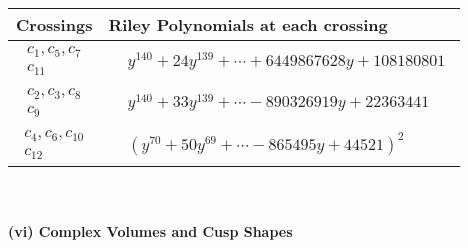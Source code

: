 \documentclass[1p]{elsarticle_modified}
\theoremstyle{definition}
\begin{document}
\begin{tabular}{m{50pt}|m{274pt}}
Crossings & \hspace{64pt}Riley Polynomials at each crossing \\
\hline $$\begin{aligned}c_{1},c_{5},c_{7}\\c_{11}\end{aligned}$$&$\begin{aligned}
&y^{140}+24 y^{139}+\cdots+6449867628 y+108180801
\end{aligned}$\\
\hline $$\begin{aligned}c_{2},c_{3},c_{8}\\c_{9}\end{aligned}$$&$\begin{aligned}
&y^{140}+33 y^{139}+\cdots-890326919 y+22363441
\end{aligned}$\\
\hline $$\begin{aligned}c_{4},c_{6},c_{10}\\c_{12}\end{aligned}$$&$\begin{aligned}
&(y^{70}+50 y^{69}+\cdots-865495 y+44521)^{2}
\end{aligned}$\\
\hline
\end{tabular}\\~\\
\newpage\flushleft \textbf{(vi) Complex Volumes and Cusp Shapes}
\end{document}
